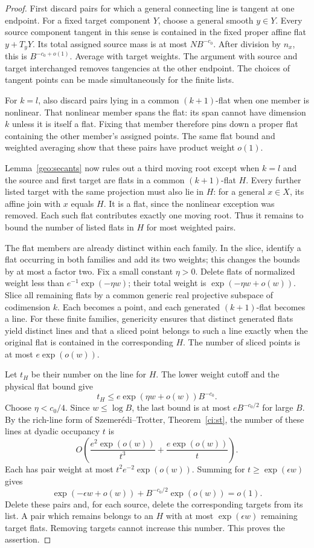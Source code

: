 \begin{proof}
First discard pairs for which a general connecting line is tangent at
one endpoint. For a fixed target component $Y$, choose a general
smooth $y\in Y$. Every source component tangent in this sense is
contained in the fixed proper affine flat $y+T_yY$.
Its total assigned source mass is at most $NB^{-c_0}$.
After division by $n_x$, this is $B^{-c_0+o(1)}$.
Average with target weights. The argument with source and target
interchanged removes tangencies at the other endpoint. The choices
of tangent points can be made simultaneously for the finite lists.

For $k=l$, also discard pairs lying in a common $(k+1)$-flat when one
member is nonlinear. That nonlinear member spans the flat: its span
cannot have dimension $k$ unless it is itself a flat. Fixing that
member therefore pins down a proper flat containing the other
member's assigned points. The same flat bound and weighted averaging
show that these pairs have product weight $o(1)$.

Lemma~\ref{geo:secants} now rules out a third moving root except when
$k=l$ and the source and first target are flats in a common
$(k+1)$-flat $H$. Every further listed target with the same projection
must also lie in $H$: for a general $x\in X$, its affine join with $x$
equals $H$. It is a flat, since the nonlinear exception was removed.
Each such flat contributes exactly one moving root. Thus it remains
to bound the number of listed flats in $H$ for most weighted pairs.

The flat members are already distinct within each family.  In the slice,
identify a flat occurring in both families and add its two weights; this
changes the bounds by at most a factor two. Fix a small constant
$\eta>0$. Delete flats of normalized weight less than
$e^{-1}\exp(-\eta w)$; their total weight is
$\exp(-\eta w+o(w))$. Slice all remaining flats by a common generic
real projective subspace of codimension $k$. Each becomes a point,
and each generated $(k+1)$-flat becomes a line. For these finite
families, genericity ensures that distinct generated flats yield
distinct lines and that a sliced point belongs to such a line exactly
when the original flat is contained in the corresponding $H$.
The number of sliced points is at most $e\exp(o(w))$.

Let $t_H$ be their number on the line for $H$. The lower weight cutoff
and the physical flat bound give
\[
 t_H\le e\exp(\eta w+o(w))B^{-c_0}.
\]
Choose $\eta<c_0/4$. Since $w\le\log B$, the last bound is at most
$eB^{-c_0/2}$ for large $B$. By the rich-line form of
Szemer\'edi--Trotter, Theorem~\ref{ci:st}, the number of these
lines at dyadic occupancy $t$ is
\[
 O\!\left(\frac{e^2\exp(o(w))}{t^3}
            +\frac{e\exp(o(w))}{t}\right).
\]
Each has pair weight at most $t^2e^{-2}\exp(o(w))$.
Summing for $t\ge\exp(\epsilon w)$ gives
\[
 \exp(-\epsilon w+o(w))+B^{-c_0/2}\exp(o(w))=o(1).
\]
Delete these pairs and, for each source, delete the corresponding
targets from its list. A pair which remains belongs to an $H$ with
at most $\exp(\epsilon w)$ remaining target flats. Removing targets
cannot increase this number. This proves the assertion.


\end{proof}
